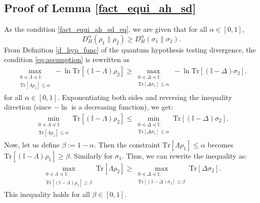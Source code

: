 \documentclass[onecolumn,ldraftcls, 11pt]{IEEEtran}
\newcommand{\tr}{\mathrm{Tr}}
\newcommand*{\bbI}{\mathbb{I}}
\begin{document}
\subsection{Proof of Lemma \ref{fact_equi_ah_sd}}\label{proof_fact_equi_ah_sd}
As the condition \eqref{fact_equi_ah_sd_eq}, we are given that 
for all $\alpha \in [0,1]$,
\begin{equation}
D^{\alpha}_{H}{(\rho_1\|\rho_2)} \geq D^{\alpha}_{H}{(\sigma_1\|\sigma_2)}. \label{eq:assumption}
\end{equation}
From Definition \ref{d_hyp_func} of 
the quantum hypothesis testing divergence,
the condition \eqref{eq:assumption} is rewritten as
\begin{align}
\max_{\substack{0 \preceq \Lambda \preceq \bbI:\\
\tr[\Lambda \rho_1] \leq \alpha}} -\ln \tr[(\bbI - \Lambda)\rho_2] 
\geq \max_{\substack{0 \preceq \Delta \preceq \bbI:\\
\tr[\Delta \sigma_1] \leq \alpha}} -\ln \tr[(\bbI - \Delta)\sigma_2]. \label{eq:divergence_comparison}
\end{align}
for all $\alpha \in [0,1]$.
Exponentiating both sides and reversing the inequality direction (since $-\ln$ is a decreasing function), we get:
\begin{align}
\min_{\substack{0 \preceq \Lambda \preceq \bbI:\\
\tr[\Lambda \rho_1] \leq \alpha}} \tr[(\bbI - \Lambda)\rho_2] 
\leq \min_{\substack{0 \preceq \Delta \preceq \bbI:\\
\tr[\Delta \sigma_1] \leq \alpha}} \tr[(\bbI - \Delta)\sigma_2]. \label{eq:min_comparison}
\end{align}
Now, let us define $\beta := 1 - \alpha$. Then the constraint $\tr[\Lambda \rho_1] \leq \alpha$ becomes $\tr[(\bbI - \Lambda)\rho_1] \geq \beta$. Similarly for $\sigma_1$. Thus, we can rewrite the inequality as:
\begin{align}
\max_{\substack{0 \preceq \Lambda \preceq \bbI:\\
\tr[(\bbI - \Lambda)\rho_1] \geq \beta}} \tr[\Lambda \rho_2] 
\geq \max_{\substack{0 \preceq \Delta \preceq \bbI:\\
\tr[(\bbI - \Delta)\sigma_1] \geq \beta}} \tr[\Delta \sigma_2]. \label{eq:max_comparison}
\end{align}
This inequality holds for all $\beta \in [0,1]$.
\end{document}
